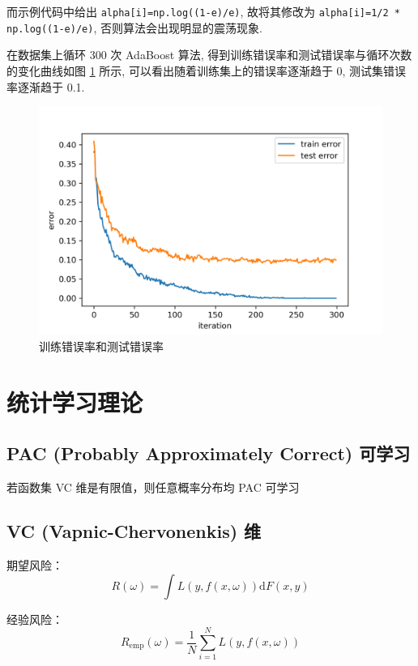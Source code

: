 \documentclass[openany]{ctexbook}
\theoremstyle{kaiti}
\theoremstyle{normal}
\begin{document}
而示例代码中给出 \verb|alpha[i]=np.log((1-e)/e)|, 故将其修改为 \verb|alpha[i]=1/2 * np.log((1-e)/e)|, 否则算法会出现明显的震荡现象.

在数据集上循环 300 次 AdaBoost 算法, 得到训练错误率和测试错误率与循环次数的变化曲线如图 \ref{fig:error_rate} 所示, 可以看出随着训练集上的错误率逐渐趋于 0, 测试集错误率逐渐趋于 0.1.

\begin{figure}[htbp]
  \centering
  \includegraphics[width=12cm]{error.png}
  \caption{训练错误率和测试错误率}
  \label{fig:error_rate}
\end{figure}

\chapter{统计学习理论}

\section{PAC (Probably Approximately Correct) 可学习}

若函数集 VC 维是有限值，则任意概率分布均 PAC 可学习

\section{VC (Vapnic-Chervonenkis) 维}

期望风险：
\begin{equation}
R\left(\omega \right)=\int L\left(y,f\left(x,\omega \right)\right)\mathrm{d}F\left(x,y \right)
\end{equation}

经验风险：
\begin{equation}
R_{\mathrm{emp}}\left(\omega \right)=\frac{1}{N}\sum_{i=1}^{N}L\left(y,f\left(x,\omega \right)\right)
\end{equation}
\end{document}
